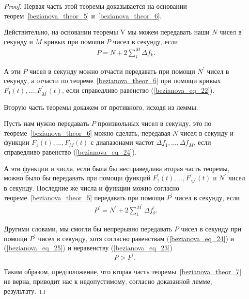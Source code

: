 \begin{proof}
Первая часть этой теоремы доказывается на основании теорем~\ref{bezianova_theor_5} и~\ref{bezianova_theor_6}.

Действительно, на основании теоремы $\mathrm{V}$ мы можем передавать наши $N$ чисел в секунду и $M$ кривых при помощи $P$ чисел в секунду, если
\begin{equation}\label{bezianova_eq_24}
\begin{gathered}
P=N+2 \sum_I^M \Delta f_k.
\end{gathered}
\end{equation}

А эти $P$ чисел в секунду можно отчасти передавать при помощи $N^{\prime}$ чисел в секунду, а отчасти по теореме~\ref{bezianova_theor_6} при помощи кривых $F_1^{\prime}(t), \ldots, F_{M^{\prime}}^{\prime}(t)$, если справедливо равенство (\ref{bezianova_eq_22}).

Вторую часть теоремы докажем от противного, исходя из леммы.

Пусть нам нужно передавать $P$ произвольных чисел в секунду, это по теореме~\ref{bezianova_theor_6} можно сделать, передавая $N$ чисел в секунду и функции $F_1(t), \ldots, F_M(t)$ с диапазонами частот $\Delta f_1, \ldots, \Delta f_M$, если справедливо равенство (\ref{bezianova_eq_24}).

А эти функции и числа, если была бы несправедлива вторая часть теоремы, можно было бы передавать при помощи функций $F_1^{\prime}(t), \ldots, F_{M^{\prime}}^{\prime}(t)$ и $N^{\prime}$ чисел в секунду. Последние же числа и функции можно согласно теореме~\ref{bezianova_theor_5} передавать при помощи $P^{\prime}$ чисел в секунду, если
\begin{equation}\label{bezianova_eq_25}
\begin{gathered}
P^{\prime}=N^{\prime}+2 \sum_1^{M^{\prime}} \Delta f_k^{\prime}. 
\end{gathered}
\end{equation}

Другими словами, мы смогли бы непрерывно передавать $P$ чисел в секунду при помощи $P^{\prime}$ чисел в секунду, хотя согласно равенствам (\ref{bezianova_eq_24}) и (\ref{bezianova_eq_25}) и неравенству (\ref{bezianova_eq_23})
$$
P>P^{\prime} \text {. }
$$

Таким образом, предположение, что вторая часть теоремы~\ref{bezianova_theor_7} не верна, приводит нас к недопустимому, согласно доказанной лемме, результату.
\end{proof}

